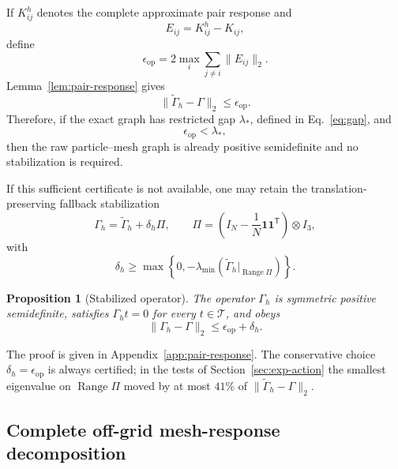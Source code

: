 \documentclass[11pt]{article}
\theoremstyle{plain}
\newtheorem{proposition}{Proposition}[section]
\newcommand{\cT}{\mathcal{T}}
\newcommand{\Range}{\operatorname{Range}}
\DeclareRobustCommand{\_}{\textunderscore\allowbreak}
\begin{document}
If $K^h_{ij}$ denotes the complete approximate pair response and
\begin{equation}
E_{ij}=K^h_{ij}-K_{ij},
\end{equation}
define
\begin{equation}
\epsilon_{\mathrm{op}}
=
2\max_i\sum_{j\ne i}\|E_{ij}\|_2.
\end{equation}
Lemma~\ref{lem:pair-response} gives
\begin{equation}
\label{eq:op-bound}
\|\widetilde\Gamma_h-\Gamma\|_2
\le
\epsilon_{\mathrm{op}}.
\end{equation}
Therefore, if the exact graph has restricted gap $\lambda_*$, defined in
Eq.~\eqref{eq:gap}, and
\begin{equation}
\epsilon_{\mathrm{op}}<\lambda_*,
\end{equation}
then the raw particle--mesh graph is already positive semidefinite and no
stabilization is required.

If this sufficient certificate is not available, one may retain the
translation-preserving fallback stabilization
\begin{equation}
\label{eq:stabilized}
\Gamma_h
=
\widetilde\Gamma_h
+
\delta_h\Pi,
\qquad
\Pi
=
\left(I_N-\frac1N\mathbf1\mathbf1^{\mathsf T}\right)\otimes I_3,
\end{equation}
with
\begin{equation}
\delta_h
\ge
\max\left\{
0,-\lambda_{\min}
\left(
\widetilde\Gamma_h|_{\Range\Pi}
\right)
\right\}.
\end{equation}

\begin{proposition}[Stabilized operator]
\label{prop:stabilized}
The operator $\Gamma_h$ is symmetric positive semidefinite, satisfies
$\Gamma_h t=0$ for every $t\in\cT$, and obeys
\begin{equation}
\|\Gamma_h-\Gamma\|_2\le\epsilon_{\mathrm{op}}+\delta_h.
\end{equation}
\end{proposition}

The proof is given in Appendix~\ref{app:pair-response}. The conservative choice $\delta_h=\epsilon_{\mathrm{op}}$ is always
certified; in the tests of Section~\ref{sec:exp-action} the smallest eigenvalue on $\Range\Pi$ moved by at most
$41\%$ of $\|\widetilde\Gamma_h-\Gamma\|_2$.

\subsection{Complete off-grid mesh-response decomposition}
\end{document}
